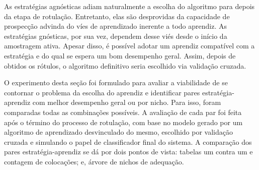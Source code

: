 As estratégias agnósticas adiam naturalmente a escolha do algoritmo para depois da
etapa de rotulação.
Entretanto, elas são desprovidas da capacidade de prospecção advinda do víes de
aprendizado inerente a todo aprendiz.
As estratégias gnósticas, por sua vez, dependem desse viés desde o início da amostragem ativa.
Apesar disso, é possível adotar um aprendiz compatível com a estratégia e do qual
se espera um bom desempenho geral.
Assim, depois de obtidos os rótulos, o algoritmo definitivo seria escolhido via validação cruzada.

O experimento desta seção foi formulado para avaliar a viabilidade de se contornar o
problema da escolha do aprendiz e identificar pares estratégia-aprendiz com melhor
desempenho geral ou por nicho.
Para isso, foram comparadas todas as combinações possíveis.
A avaliação de cada par foi feita após o término do processo de rotulação,
com base no modelo gerado por um algoritmo de aprendizado desvinculado do mesmo,
escolhido por validação cruzada e simulando o papel de classificador final do sistema.
A comparação dos pares estratégia-aprendiz se dá por dois pontos de vista:
tabelas um contra um e contagem de colocações; e, árvore de nichos de adequação.



